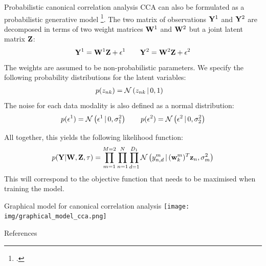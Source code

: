 \documentclass[aspectratio=169,notes]{beamer}
\begin{document}
	\begin{frame}{Probabilistic canonical correlation analysis}
	CCA can also be formulated as a probabilistic generative model \footcite{Bach2005}. The two matrix of observations ${\bf Y}^{1}$ and ${\bf Y}^{2}$ are decomposed in terms of two weight matrices ${\bf W}^{1}$ and ${\bf W}^{2}$ but a joint latent matrix ${\bf Z}$:
	\begin{align*}
		{\bf Y}^{1} = {\bf W}^{1} {\bf Z} + \epsilon^{1} \qquad 
		{\bf Y}^{2} = {\bf W}^{2} {\bf Z} + \epsilon^{2}
	\end{align*}
	The weights are assumed to be non-probabilistic parameters. We specify the following probability distributions for the latent variables:
	\begin{align*}
		p(z_{nk}) &= \mathcal{N}\left(z_{nk} \,|\, 0,1\right)
	\end{align*}
	The noise for each data modality is also defined as a normal distribution:
	\begin{align*}
		p(\epsilon^{1}) = \mathcal{N}\left(\epsilon^{1} \,|\, 0,\sigma_{1}^2\right) \qquad 
		p(\epsilon^{2}) = \mathcal{N}\left(\epsilon^{2} \,|\, 0,\sigma_{2}^2\right)
	\end{align*}
	\end{frame}

	\begin{frame}
	All together, this yields the following likelihood function:
	\[
		p({\bf Y}|{\bf W},{\bf Z},\tau) = \prod_{m=1}^{M=2} \prod_{n=1}^{N} \prod_{d=1}^{D_1} \mathcal{N}\left(y^{m}_{n,d} \,|\, ({\bf w}_{k}^{m})^T {\bf z}_{n},\sigma_{m}^2\right)
	\]
	This will correspond to the objective function that needs to be maximised when training the model.
	\end{frame}

	\begin{frame}{Graphical model for canonical correlation analysis}
	\centering
	\texttt{[image: img/graphical\_model\_cca.png]}
	\end{frame}



	
	\begin{frame}[allowframebreaks]{References}
  	\printbibliography[heading=none]
	\end{frame}
\end{document}
